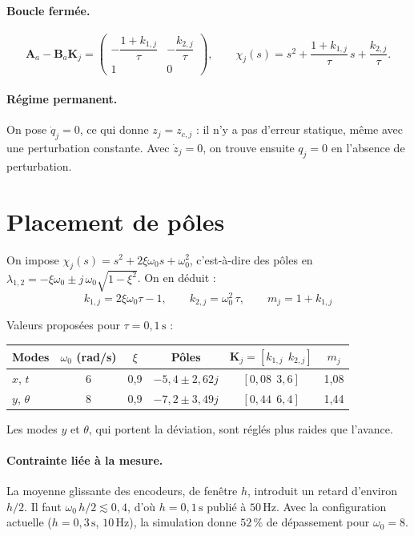 \documentclass[11pt,a4paper]{article}
\newcommand{\SI}[2]{\ensuremath{#1\,\mathrm{#2}}}
\newcommand{\vect}[1]{\boldsymbol{#1}}
\begin{document}
\paragraph{Boucle fermée.}
\begin{equation}
\vect A_a-\vect B_a\vect K_j=
\begin{pmatrix}-\dfrac{1+k_{1,j}}{\tau} & -\dfrac{k_{2,j}}{\tau}\\[2mm] 1 & 0\end{pmatrix},
\qquad
\chi_j(s)=s^2+\frac{1+k_{1,j}}{\tau}\,s+\frac{k_{2,j}}{\tau}.
\end{equation}

\paragraph{Régime permanent.}
On pose $\dot q_j=0$, ce qui donne $z_j=z_{c,j}$ : il n'y a pas d'erreur statique, même avec une perturbation constante.
Avec $\dot z_j=0$, on trouve ensuite $q_j=0$ en l'absence de perturbation.

\section{Placement de pôles}\label{sec:poles}

On impose $\chi_j(s)=s^2+2\xi\omega_0 s+\omega_0^2$, c'est-à-dire des pôles en
$\lambda_{1,2}=-\xi\omega_0\pm j\,\omega_0\sqrt{1-\xi^2}$. On en déduit :
\begin{equation}
\boxed{\,k_{1,j}=2\xi\omega_0\tau-1,\qquad k_{2,j}=\omega_0^2\,\tau,\qquad m_j=1+k_{1,j}\,}
\end{equation}

Valeurs proposées pour $\tau=\SI{0{,}1}{s}$ :
\begin{center}
\begin{tabular}{lccccc}
\toprule
Modes & $\omega_0$ (rad/s) & $\xi$ & Pôles & $\vect K_j=[k_{1,j}\ \ k_{2,j}]$ & $m_j$\\
\midrule
$x$, $t$ & 6 & 0,9 & $-5{,}4\pm2{,}62j$ & $[0{,}08\ \ 3{,}6]$ & 1,08\\
$y$, $\theta$ & 8 & 0,9 & $-7{,}2\pm3{,}49j$ & $[0{,}44\ \ 6{,}4]$ & 1,44\\
\bottomrule
\end{tabular}
\end{center}
Les modes $y$ et $\theta$, qui portent la déviation, sont réglés plus raides que l'avance.

\paragraph{Contrainte liée à la mesure.}
La moyenne glissante des encodeurs, de fenêtre $h$, introduit un retard d'environ $h/2$.
Il faut $\omega_0\,h/2\lesssim0{,}4$, d'où $h=\SI{0{,}1}{s}$ publié à \SI{50}{Hz}.
Avec la configuration actuelle ($h=\SI{0{,}3}{s}$, \SI{10}{Hz}), la simulation donne \SI{52}{\%} de dépassement pour $\omega_0=8$.
\end{document}
